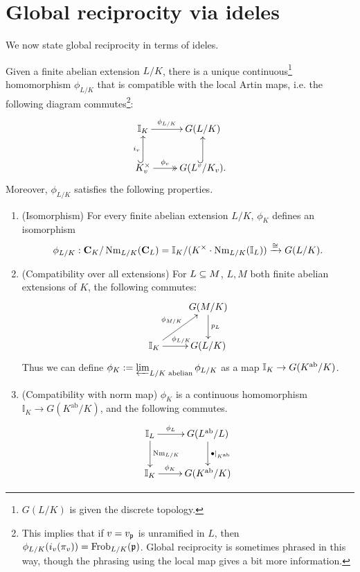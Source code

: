 \section{Global reciprocity via ideles}
We now state global reciprocity in terms of ideles.
\begin{thm}
Given a finite abelian extension $L/K$, there is a unique continuous\footnote{$G(L/K)$ is given the discrete topology.} %
homomorphism $\phi_{L/K}$ that is compatible with the local Artin maps, i.e. the following diagram commutes\footnote{This implies that if $v=v_{\mathfrak{p}}$ is unramified in $L$, then $\phi_{L/K}(i_v(\pi_v))=\operatorname{Frob}_{L/K}(\mathfrak{p})$. Global reciprocity is sometimes phrased in this way, though the phrasing using the local map gives a bit more information.}: %
\[
\xymatrix{
\mathbb I_K\ar[r]^-{\phi_{L/K}}&G(L/K)\\
K_v^{\times}\ar@{->>}[r]^-{\phi_v}\ar@{^(->}[u]^{i_v}&
G(L^v/K_v).\ar@{^(->}[u]
}
\]
Moreover, $\phi_{L/K}$ satisfies the following properties.
\begin{enumerate}
\item (Isomorphism) For every finite abelian extension $L/K$, $\phi_K$ defines an isomorphism
\[
\phi_{L/K}:
\mathbf C_K/\operatorname{Nm}_{L/K}(\mathbf C_L)=
\mathbb I_K/(K^{\times}\cdot \operatorname{Nm}_{L/K}(\mathbb I_L))\xrightarrow{\cong} G(L/K).
\]
\item (Compatibility over all extensions) For $L\subseteq M$, $L,M$ both finite abelian extensions of $K$, the following commutes:
\[
\xymatrix{
& G(M/K)\ar[d]^{p_L}\\
\I_K\ar[ru]^{\phi_{M/K}}\ar[r]^{\phi_{L/K}}& G(L/K)
}
\]
Thus we can define $\phi_K:=\varprojlim_{L/K\text{ abelian}} \phi_{L/K}$ as a map $\mathbb{I}_K\to G(K^{\text{ab}}/K)$.
\item (Compatibility with norm map) $\phi_K$ is a continuous homomorphism $\mathbb{I}_K\to G(K^{\text{ab}}/K)$, and the following commutes.
\[
\xymatrix{
\I_L\ar[r]^-{\phi_L} \ar[d]^{\nm_{L/K}}& G(L^{\text{ab}}/L)\ar[d]^{\bullet|_{K^{\text{ab}}}}\\
\I_K\ar[r]^-{\phi_K}&  G(K^{\text{ab}}/K)
}
\]
\end{enumerate}
\end{thm}
